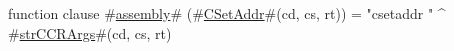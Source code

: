 function clause #\hyperref[sailMIPSzassembly]{assembly}# (#\hyperref[sailMIPSzCSetAddr]{CSetAddr}#(cd, cs, rt)) = "csetaddr " ^ #\hyperref[sailMIPSzstrCCRArgs]{strCCRArgs}#(cd, cs, rt)
